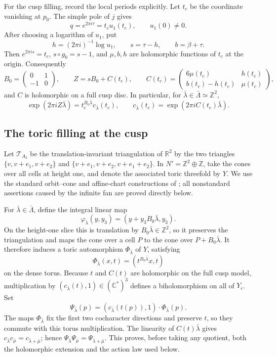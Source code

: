 For the cusp filling, record the local periods explicitly.  Let \(t_c\) be
the coordinate vanishing at \(p_0\).  The simple pole of \(j\) gives
\[
 q=e^{2\pi i\tau}=t_cu_1(t_c),\qquad u_1(0)\ne0.
\]
After choosing a logarithm of \(u_1\), put
\[
 h=(2\pi i)^{-1}\log u_1,\qquad s=\tau-h,
 \qquad b=\beta+\tau.
\]
Then \(e^{2\pi is}=t_c\), \(s\circ g_0=s-1\), and \(\mu,b,h\) are
holomorphic functions of \(t_c\) at the origin.  Consequently
\[
 B_0=\begin{pmatrix}0&1\\-1&0\end{pmatrix},\qquad
 Z=sB_0+C(t_c),\qquad
 C(t_c)=
 \begin{pmatrix}
 6\mu(t_c)&h(t_c)\\
 b(t_c)-h(t_c)&\mu(t_c)
 \end{pmatrix},
 \tag{2.5a}
\]
and \(C\) is holomorphic on a full cusp disc.  In particular, for
\(\bar\lambda\in\bar\Lambda\simeq\mathbb Z^2\),
\[
 \exp(2\pi iZ\bar\lambda)
 =t_c^{B_0\bar\lambda}c_{\bar\lambda}(t_c),
 \qquad
 c_{\bar\lambda}(t_c)=\exp(2\pi iC(t_c)\bar\lambda).
 \tag{2.5b}
\]

\subsection{The toric filling at the cusp}

Let \(\mathcal T_{A_2}\) be the translation-invariant triangulation of
\(\mathbb R^2\) by the two triangles
\(\{v,v+e_1,v+e_2\}\) and
\(\{v+e_1,v+e_2,v+e_1+e_2\}\).  In
\(N'=\mathbb Z^2\oplus\mathbb Z\), take the cones over all cells at height
one, and denote the associated toric threefold by \(Y\).
We use the standard orbit--cone and affine-chart constructions of
\cite[Chapters~1 and~3]{Fulton1993}; all nonstandard assertions caused by
the infinite fan are proved directly below.

For \(\bar\lambda\in\bar\Lambda\), define the integral linear map
\[
 \varphi_{\bar\lambda}(y,y_3)
 =(y+y_3B_0\bar\lambda,y_3).
\]
On the height-one slice this is translation by
\(B_0\bar\lambda\in\mathbb Z^2\), so it preserves the triangulation and
maps the cone over a cell \(P\) to the cone over
\(P+B_0\bar\lambda\).  It therefore induces a toric automorphism
\(\Phi_{\bar\lambda}\) of \(Y\), satisfying
\[
 \Phi_{\bar\lambda}(x,t)
 =(t^{B_0\bar\lambda}x,t)
\]
on the dense torus.  Because \(t\) and \(C(t)\) are holomorphic on the
full cusp model, multiplication by
\((c_{\bar\lambda}(t),1)\in(\mathbb C^*)^3\) defines a biholomorphism on
all of \(Y_\epsilon\).  Set
\[
 \Psi_{\bar\lambda}(p)
 =(c_{\bar\lambda}(t(p)),1)\cdot\Phi_{\bar\lambda}(p).
\]
The maps \(\Phi_{\bar\lambda}\) fix the first two cocharacter directions
and preserve \(t\), so they commute with this torus multiplication.  The
linearity of \(C(t)\bar\lambda\) gives
\(c_{\bar\lambda}c_{\bar\mu}=c_{\bar\lambda+\bar\mu}\); hence
\(\Psi_{\bar\lambda}\Psi_{\bar\mu}
=\Psi_{\bar\lambda+\bar\mu}\).  This proves, before taking any quotient,
both the holomorphic extension and the action law used below.

